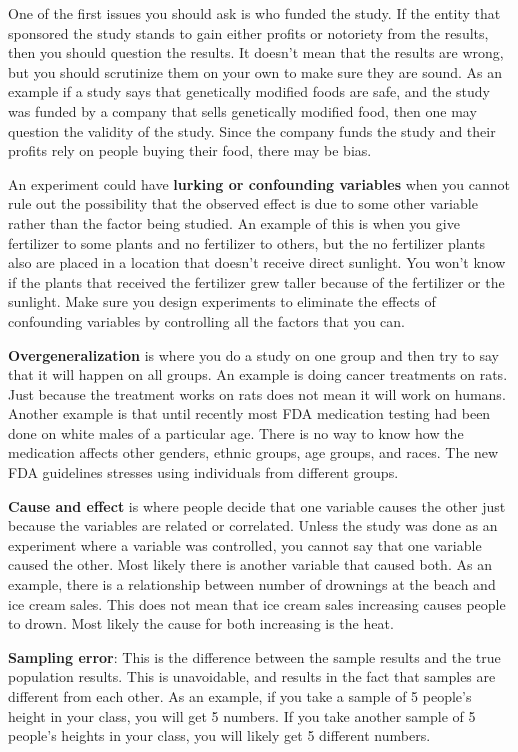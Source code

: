 \documentclass[]{book}
\begin{document}
One of the first issues you should ask is who funded the study. If the
entity that sponsored the study stands to gain either profits or
notoriety from the results, then you should question the results. It
doesn't mean that the results are wrong, but you should scrutinize them
on your own to make sure they are sound. As an example if a study says
that genetically modified foods are safe, and the study was funded by a
company that sells genetically modified food, then one may question the
validity of the study. Since the company funds the study and their
profits rely on people buying their food, there may be bias.

An experiment could have \textbf{lurking or confounding variables} when you
cannot rule out the possibility that the observed effect is due to some
other variable rather than the factor being studied. An example of this
is when you give fertilizer to some plants and no fertilizer to others,
but the no fertilizer plants also are placed in a location that doesn't
receive direct sunlight. You won't know if the plants that received the
fertilizer grew taller because of the fertilizer or the sunlight. Make
sure you design experiments to eliminate the effects of confounding
variables by controlling all the factors that you can.

\textbf{Overgeneralization} is where you do a study on one group and then try
to say that it will happen on all groups. An example is doing cancer
treatments on rats. Just because the treatment works on rats does not
mean it will work on humans. Another example is that until recently most
FDA medication testing had been done on white males of a particular age.
There is no way to know how the medication affects other genders, ethnic
groups, age groups, and races. The new FDA guidelines stresses using
individuals from different groups.

\textbf{Cause and effect} is where people decide that one variable causes the
other just because the variables are related or correlated. Unless the
study was done as an experiment where a variable was controlled, you
cannot say that one variable caused the other. Most likely there is
another variable that caused both. As an example, there is a
relationship between number of drownings at the beach and ice cream
sales. This does not mean that ice cream sales increasing causes people
to drown. Most likely the cause for both increasing is the heat.

\textbf{Sampling error}: This is the difference between the sample results
and the true population results. This is unavoidable, and results in the
fact that samples are different from each other. As an example, if you
take a sample of 5 people's height in your class, you will get 5
numbers. If you take another sample of 5 people's heights in your class,
you will likely get 5 different numbers.
\end{document}
